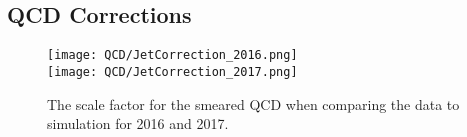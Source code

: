 \subsection{QCD Corrections}



%

\begin{figure}
	\begin{center}
  \texttt{[image: QCD/JetCorrection\_2016.png]} \\
  \texttt{[image: QCD/JetCorrection\_2017.png]} \\
	\end{center}
	\caption[QCD Jet Response Scale Factor]{The scale factor for the smeared QCD when comparing the data to simulation for 2016 and 2017.}
	\label{fig:qcd-cr-response-sf-1}
\end{figure}

